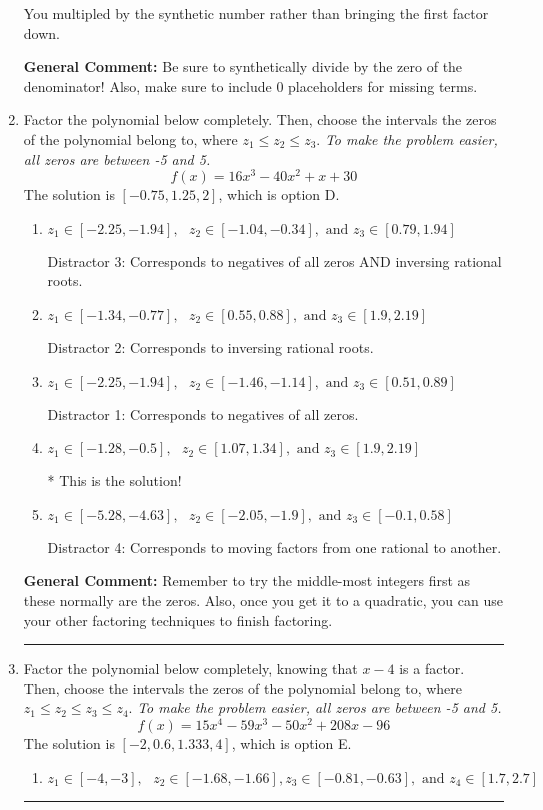\documentclass{extbook}[14pt]
\newcommand{\litem}[1]{\item #1

\rule{\textwidth}{0.4pt}}
\begin{document}
\begin{enumerate}
{\begin{enumerate}[label=\Alph*.]
 You multipled by the synthetic number rather than bringing the first factor down.
\end{enumerate}

\textbf{General Comment:} Be sure to synthetically divide by the zero of the denominator! Also, make sure to include 0 placeholders for missing terms.
}
\litem{
Factor the polynomial below completely. Then, choose the intervals the zeros of the polynomial belong to, where $z_1 \leq z_2 \leq z_3$. \textit{To make the problem easier, all zeros are between -5 and 5.}
\[ f(x) = 16x^{3} -40 x^{2} +x + 30 \]The solution is \( [-0.75, 1.25, 2] \), which is option D.\begin{enumerate}[label=\Alph*.]
\item \( z_1 \in [-2.25, -1.94], \text{   }  z_2 \in [-1.04, -0.34], \text{   and   } z_3 \in [0.79, 1.94] \)

 Distractor 3: Corresponds to negatives of all zeros AND inversing rational roots.
\item \( z_1 \in [-1.34, -0.77], \text{   }  z_2 \in [0.55, 0.88], \text{   and   } z_3 \in [1.9, 2.19] \)

 Distractor 2: Corresponds to inversing rational roots.
\item \( z_1 \in [-2.25, -1.94], \text{   }  z_2 \in [-1.46, -1.14], \text{   and   } z_3 \in [0.51, 0.89] \)

 Distractor 1: Corresponds to negatives of all zeros.
\item \( z_1 \in [-1.28, -0.5], \text{   }  z_2 \in [1.07, 1.34], \text{   and   } z_3 \in [1.9, 2.19] \)

* This is the solution!
\item \( z_1 \in [-5.28, -4.63], \text{   }  z_2 \in [-2.05, -1.9], \text{   and   } z_3 \in [-0.1, 0.58] \)

 Distractor 4: Corresponds to moving factors from one rational to another.
\end{enumerate}

\textbf{General Comment:} Remember to try the middle-most integers first as these normally are the zeros. Also, once you get it to a quadratic, you can use your other factoring techniques to finish factoring.
}
\litem{
Factor the polynomial below completely, knowing that $x -4$ is a factor. Then, choose the intervals the zeros of the polynomial belong to, where $z_1 \leq z_2 \leq z_3 \leq z_4$. \textit{To make the problem easier, all zeros are between -5 and 5.}
\[ f(x) = 15x^{4} -59 x^{3} -50 x^{2} +208 x -96 \]The solution is \( [-2, 0.6, 1.333, 4] \), which is option E.\begin{enumerate}[label=\Alph*.]
\item \( z_1 \in [-4, -3], \text{   }  z_2 \in [-1.68, -1.66], z_3 \in [-0.81, -0.63], \text{   and   } z_4 \in [1.7, 2.7] \)


\end{enumerate}}
\end{enumerate}
\end{document}
